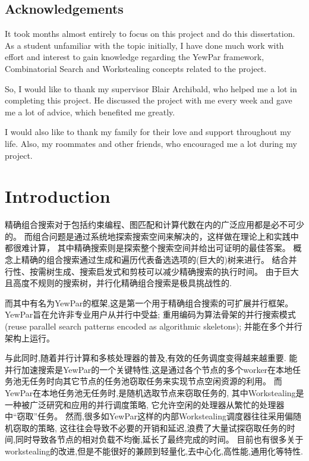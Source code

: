\documentclass{mproj}
\begin{document}
\educationalconsent



\newpage
\section*{Acknowledgements}

It took months almost entirely to focus on this project and do this dissertation.
As a student unfamiliar with the topic initially,
I have done much work with effort and interest to gain knowledge regarding the YewPar framework,
Combinatorial Search and Workstealing concepts related to the project.

So, I would like to thank my supervisor Blair Archibald, who helped me a lot in completing this project.
He discussed the project with me every week and gave me a lot of advice, which benefited me
greatly.

I would also like to thank my family for their love and support throughout my life. Also, my
roommates and other friends, who encouraged me a lot during my project.

\tableofcontents

\chapter{Introduction}\label{intro}

精确组合搜索对于包括约束编程、图匹配和计算代数在内的广泛应用都是必不可少的。
而组合问题是通过系统地探索搜索空间来解决的，这样做在理论上和实践中都很难计算，
其中精确搜索则是探索整个搜索空间并给出可证明的最佳答案。
概念上精确的组合搜索通过生成和遍历代表备选选项的(巨大的)树来进行。
结合并行性、按需树生成、搜索启发式和剪枝可以减少精确搜索的执行时间。
由于巨大且高度不规则的搜索树，并行化精确组合搜索是极具挑战性的.

而其中有名为YewPar\cite{10.1145/3332466.3374537}的框架,这是第一个用于精确组合搜索的可扩展并行框架。
YewPar旨在允许非专业用户从并行中受益;
重用编码为算法骨架的并行搜索模式(reuse parallel search patterns encoded as algorithmic skeletons);
并能在多个并行架构上运行。

与此同时,随着并行计算和多核处理器的普及,有效的任务调度变得越来越重要.
能并行加速搜索是YewPar的一个关键特性,这是通过各个节点的多个worker在本地任务池无任务时向其它节点的任务池窃取任务来实现节点空闲资源的利用。
而YewPar在本地任务池无任务时,是随机选取节点来窃取任务的,
其中Workstealing是一种被广泛研究和应用的并行调度策略,
它允许空闲的处理器从繁忙的处理器中“窃取”任务。
然而,很多如YewPar这样的内部Workstealing调度器往往采用偏随机窃取的策略,
这往往会导致不必要的开销和延迟,浪费了大量试探窃取任务的时间,同时导致各节点的相对负载不均衡,延长了最终完成的时间。
目前也有很多关于workstealing的改进,但是不能很好的兼顾到轻量化,去中心化,高性能,通用化等特性.
\end{document}
